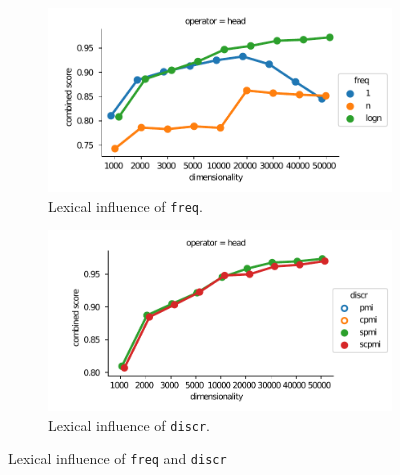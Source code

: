 \begin{figure}[t]
  \centering

  \begin{subfigure}[t]{0.49\textwidth}
    \includegraphics[width=\textwidth]{supplement/figures/lexical-interaction-freq}

    \caption{Lexical influence of \texttt{freq}.}
    \label{fig:lexical-freq}
  \end{subfigure}
  \begin{subfigure}[t]{0.49\textwidth}
    \includegraphics[width=\textwidth]{supplement/figures/lexical-interaction-discr}

    \caption{Lexical influence of \texttt{discr}.}
    \label{fig:lexical-discr}
  \end{subfigure}

  \caption{Lexical influence of \texttt{freq} and \texttt{discr}}
\end{figure}
